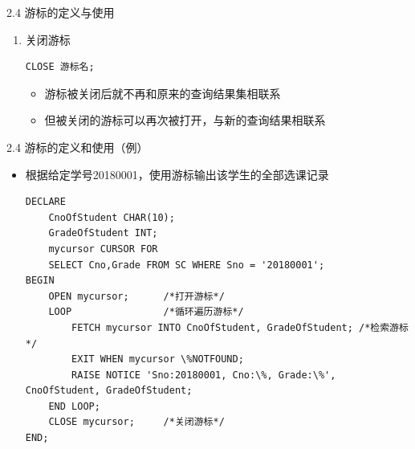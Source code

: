 \begin{frame}{2.4 游标的定义与使用}
\begin{itemize}
\begin{enumerate}
        \framebreak

\item 关闭游标
\begin{block}{}
\begin{lstlisting}
CLOSE 游标名;
\end{lstlisting}
\end{block} 
\begin{itemize}
    \item 游标被关闭后就不再和原来的查询结果集相联系
    \item 但被关闭的游标可以再次被打开，与新的查询结果相联系
\end{itemize}





    \end{enumerate}
\end{itemize}
\end{frame}
 
\begin{frame}[fragile]{2.4 游标的定义和使用（例）}
\begin{itemize}
    \item 根据给定学号20180001，使用游标输出该学生的全部选课记录
\begin{block}{}
\begin{lstlisting}[xleftmargin=0.1\textwidth,linewidth=\textwidth]
DECLARE
    CnoOfStudent CHAR(10);
    GradeOfStudent INT;
    mycursor CURSOR FOR 
    SELECT Cno,Grade FROM SC WHERE Sno = '20180001';
BEGIN
    OPEN mycursor;      /*打开游标*/
    LOOP                /*循环遍历游标*/ 
        FETCH mycursor INTO CnoOfStudent, GradeOfStudent; /*检索游标*/
        EXIT WHEN mycursor \%NOTFOUND;
        RAISE NOTICE 'Sno:20180001, Cno:\%, Grade:\%', CnoOfStudent, GradeOfStudent;
    END LOOP;
    CLOSE mycursor;     /*关闭游标*/
END;
\end{lstlisting}
\end{block} 
\end{itemize}
\end{frame}


